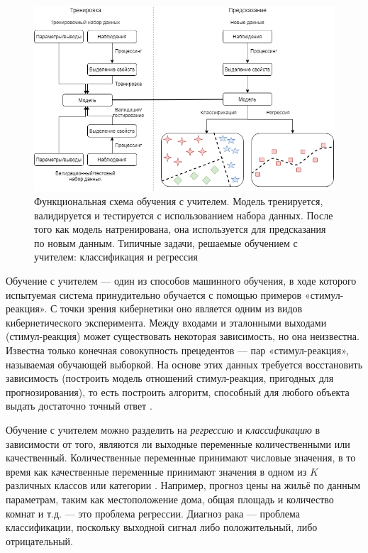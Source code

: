 \begin{figure}[ht!]
	\center
	\includegraphics [scale=0.60] {my_folder/images/ch1/supervised-learning.png}
	\caption{Функциональная схема обучения с учителем. Модель тренируется, валидируется и тестируется с использованием набора данных. После того как модель натренирована, она используется для предсказания по новым данным. Типичные задачи, решаемые обучением с учителем: классификация и регрессия}
	\label{fig:supervised-learning}
\end{figure}

Обучение с учителем --- один из способов машинного обучения, в ходе которого испытуемая система принудительно обучается с помощью примеров «стимул-реакция». С точки зрения кибернетики оно является одним из видов кибернетического эксперимента. Между входами и эталонными выходами (стимул-реакция) может существовать некоторая зависимость, но она неизвестна. Известна только конечная совокупность прецедентов — пар «стимул-реакция», называемая обучающей выборкой. На основе этих данных требуется восстановить зависимость (построить модель отношений стимул-реакция, пригодных для прогнозирования), то есть построить алгоритм, способный для любого объекта выдать достаточно точный ответ \cite{james2014introduction}.

Обучение с учителем можно разделить на \textit{регрессию} и \textit{классификацию} в зависимости от того, являются ли выходные переменные количественными или качественный. Количественные переменные принимают числовые значения, в то время как качественные переменные принимают значения в одном из $K$ различных классов или категории \cite{james2014introduction}. Например, прогноз цены на жильё по данным параметрам, таким как местоположение дома, общая площадь и количество комнат и т.д. --- это проблема регрессии. Диагноз рака --- проблема классификации, поскольку выходной сигнал либо положительный, либо отрицательный.

